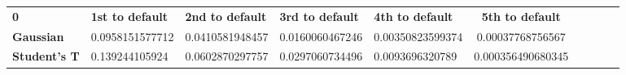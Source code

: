 \begin{center}
 \begin{tabular}{|l|l|l|l|l|c|c|c|c|c|}
\hline
\textbf{0} & \textbf{1st to default} & \textbf{2nd to default} & \textbf{3rd to default} & \textbf{4th to default} & \textbf{5th to default}\\\hhline{|=|=|=|=|=|=|}
\textbf{Gaussian} & 0.0958151577712 & 0.0410581948457 & 0.0160060467246 & 0.00350823599374 & 0.00037768756567\\
\textbf{Student's T} & 0.139244105924 & 0.0602870297757 & 0.0297060734496 & 0.0093696320789 & 0.000356490680345\\
\hline
\end{tabular}
\end{center}